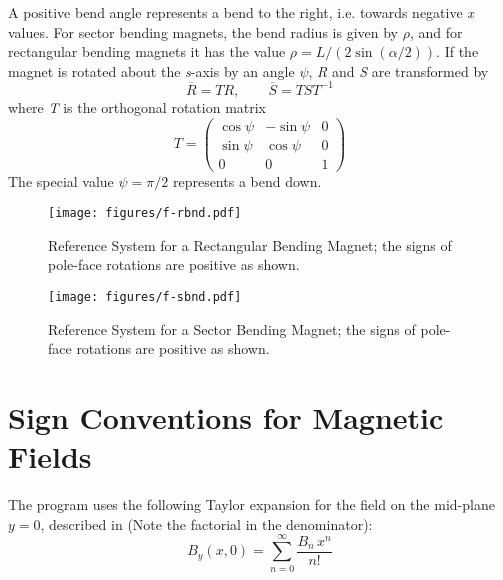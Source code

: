 A positive bend angle represents a bend to the right, i.e. towards
negative \textit{x} values. 
For sector bending magnets, the bend radius is given by $\rho$, and for
rectangular bending magnets it has the value $\rho = L / (2 \sin(\alpha/2))$. 
If the magnet is rotated about the \textit{s}-axis by an angle $\psi$,
\textit{R} and \textit{S} are transformed by  
\begin{equation}
   \overline{R}=TR,
   \qquad
   \overline{S}=TST^{-1}
\end{equation}
where \textit{T} is the orthogonal rotation matrix 
\begin{equation}
T =
 \begin{pmatrix}
  \cos \psi &  -\sin \psi & 0 \\
  \sin \psi &  \cos \psi  & 0 \\
  0	    &	0	  & 1 
 \end{pmatrix}
\end{equation}
The special value $\psi = \pi/2$ represents a bend down.  

\begin{figure}[htb]
\centering
\setlength{\unitlength}{1pt}
\texttt{[image: figures/f-rbnd.pdf]}
\caption[Reference System for a Rectangular Bending Magnet]%
{Reference System for a Rectangular Bending Magnet;
the signs of pole-face rotations are positive as shown.}
\label{F-RBND}
\end{figure}
 
\begin{figure}[htb]
\centering
\setlength{\unitlength}{1pt}
\texttt{[image: figures/f-sbnd.pdf]}
\caption[Reference System for a Sector Bending Magnet]%
{Reference System for a Sector Bending Magnet;
the signs of pole-face rotations are positive as shown.}
\label{F-SBND}
\end{figure}

\section{Sign Conventions for Magnetic Fields}
\label{sec:sign-convention}
The \madx program uses the following Taylor expansion for the field on the
mid-plane $y=0$, described in \cite{slac75} (Note the factorial in the
denominator): 
\begin{equation}
B_y(x,0)=\sum_{n=0}^{\infty} \frac{B_n\,x^n}{n!}
\end{equation}

